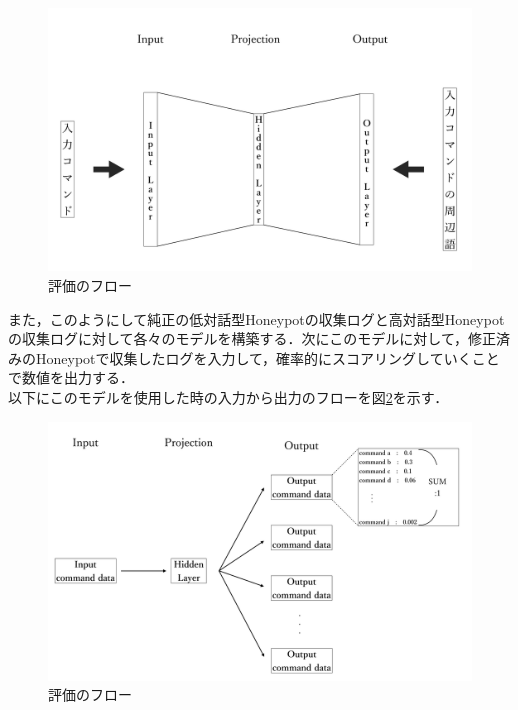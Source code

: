\vspace{10mm}
\begin{figure}[htbp]
    \centering
    \includegraphics[width=1.0\textwidth]{figures/model.png}
    \caption{評価のフロー\cite{word2vecpaper}\cite{word2vecpaper2}}
    \label{fig:hyoukaflow}
\end{figure}
\vspace{10mm}
\clearpage

また，このようにして純正の低対話型Honeypotの収集ログと高対話型Honeypotの収集ログに対して各々のモデルを構築する．次にこのモデルに対して，修正済みのHoneypotで収集したログを入力して，確率的にスコアリングしていくことで数値を出力する．\\

以下にこのモデルを使用した時の入力から出力のフローを図\ref{fig:syuturyokuflow}を示す．\\

\begin{figure}[htbp]
    \centering
    \includegraphics[width=1.0\textwidth]{figures/evalflow.png}
    \caption{評価のフロー\cite{word2vecpaper}\cite{word2vecpaper2}}
    \label{fig:syuturyokuflow}
\end{figure}

